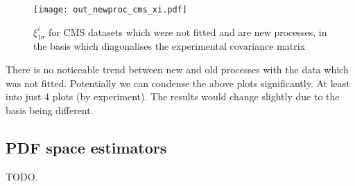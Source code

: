 \begin{figure}[h]
    \centering
    \texttt{[image: out\_newproc\_cms\_xi.pdf]}
    \caption{$\xi_{1\sigma}^{i}$ for CMS datasets which were not fitted
    and are new processes, in the basis which diagonalises the experimental
    covariance matrix}
    \label{fig:outnewcmsxi}
\end{figure}

There is no noticeable trend between new and old processes with the data which
was not fitted. Potentially we can condense the above plots significantly. At
least into just 4 plots (by experiment). The results would change slightly
due to the basis being different.

\newpage
\subsection{PDF space estimators}

TODO.
